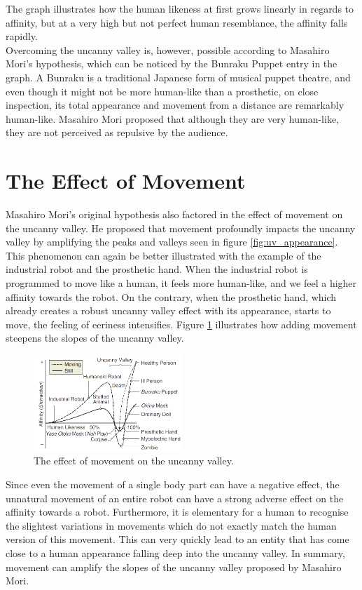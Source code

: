 The graph illustrates how the human likeness at first grows linearly in regards to affinity, but at a very high but not perfect human resemblance, the affinity falls rapidly.\\ 
Overcoming the uncanny valley is, however, possible according to Masahiro Mori's hypothesis, which can be noticed by the Bunraku Puppet entry in the graph. A Bunraku is a traditional Japanese form of musical puppet theatre, and even though it might not be more human-like than a prosthetic, on close inspection, its total appearance and movement from a distance are remarkably human-like. Masahiro Mori proposed that although they are very human-like, they are not perceived as repulsive by the audience.

\section{The Effect of Movement}
Masahiro Mori's original hypothesis \cite{original_masahiro} also factored in the effect of movement on the uncanny valley. He proposed that movement profoundly impacts the uncanny valley by amplifying the peaks and valleys seen in figure \ref{fig:uv_appearance}. This phenomenon can again be better illustrated with the example of the industrial robot and the prosthetic hand. When the industrial robot is programmed to move like a human, it feels more human-like, and we feel a higher affinity towards the robot. On the contrary, when the prosthetic hand, which already creates a robust uncanny valley effect with its appearance, starts to move, the feeling of eeriness intensifies.
Figure \ref{fig:uv_movement} illustrates how adding movement steepens the slopes of the uncanny valley.
\begin{figure} %
    \centering
    \includegraphics[width=0.5\textwidth]{graphics/uv_movement.png}
    \caption{The effect of movement on the uncanny valley.}
    \label{fig:uv_movement}
\end{figure}
Since even the movement of a single body part can have a negative effect, the unnatural movement of an entire robot can have a strong adverse effect on the affinity towards a robot. Furthermore, it is elementary for a human to recognise the slightest variations in movements which do not exactly match the human version of this movement. This can very quickly lead to an entity that has come close to a human appearance falling deep into the uncanny valley. In summary, movement can amplify the slopes of the uncanny valley proposed by Masahiro Mori.
